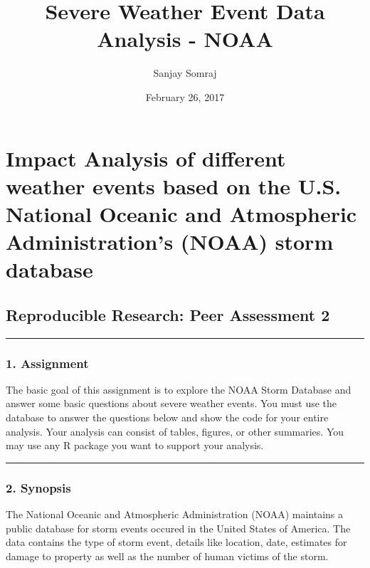 \documentclass[]{article}
\title{Severe Weather Event Data Analysis - NOAA}
\author{Sanjay Somraj}
\date{February 26, 2017}
\begin{document}
\maketitle

\section{Impact Analysis of different weather events based on the U.S.
National Oceanic and Atmospheric Administration's (NOAA) storm
database}\label{impact-analysis-of-different-weather-events-based-on-the-u.s.-national-oceanic-and-atmospheric-administrations-noaa-storm-database}

\subsection{Reproducible Research: Peer Assessment
2}\label{reproducible-research-peer-assessment-2}

\begin{center}\rule{0.5\linewidth}{\linethickness}\end{center}

\subsubsection{1. Assignment}\label{assignment}

The basic goal of this assignment is to explore the NOAA Storm Database
and answer some basic questions about severe weather events. You must
use the database to answer the questions below and show the code for
your entire analysis. Your analysis can consist of tables, figures, or
other summaries. You may use any R package you want to support your
analysis.

\begin{center}\rule{0.5\linewidth}{\linethickness}\end{center}

\subsubsection{2. Synopsis}\label{synopsis}

The National Oceanic and Atmospheric Administration (NOAA) maintains a
public database for storm events occured in the United States of
America. The data contains the type of storm event, details like
location, date, estimates for damage to property as well as the number
of human victims of the storm.
\end{document}
